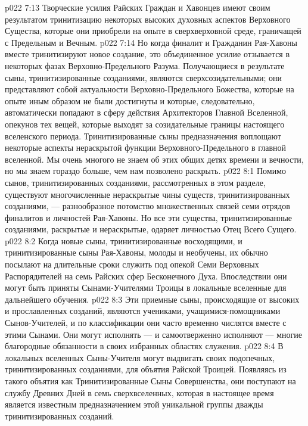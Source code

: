 \vs p022 7:13 \bibnobreakspace {} Творческие усилия Райских Граждан и Хавонцев имеют своим результатом тринитизацию некоторых высоких духовных аспектов Верховного Существа, которые они приобрели на опыте в сверхверховной среде, граничащей с Предельным и Вечным.
\vs p022 7:14 \bibnobreakspace {} Но когда финалит и Гражданин Рая\hyp{}Хавоны вместе тринитизируют новое создание, это объединенное усилие отзывается в некоторых фазах Верховно\hyp{}Предельного Разума. Получающиеся в результате сыны, тринитизированные созданиями, являются сверхсозидательными; они представляют собой актуальности Верховно\hyp{}Предельного Божества, которые на опыте иным образом не были достигнуты и которые, следовательно, автоматически попадают в сферу действия Архитекторов Главной Вселенной, опекунов тех вещей, которые выходят за созидательные границы настоящего вселенского периода. Тринитизированные сыны предназначения воплощают некоторые аспекты нераскрытой функции Верховного\hyp{}Предельного в главной вселенной. Мы очень многого не знаем об этих общих детях времени и вечности, но мы знаем гораздо больше, чем нам позволено раскрыть.
\vs p022 8:1 Помимо сынов, тринитизированных созданиями, рассмотренных в этом разделе, существуют многочисленные нераскрытые чины существ, тринитизированных созданиями, --- разнообразное потомство множественных связей семи отрядов финалитов и личностей Рая\hyp{}Хавоны. Но все эти существа, тринитизированные созданиями, раскрытые и нераскрытые, одаряет личностью Отец Всего Сущего.
\vs p022 8:2 \pc Когда новые сыны, тринитизированные восходящими, и тринитизированные сыны Рая\hyp{}Хавоны, молоды и необучены, их обычно посылают на длительные сроки служить под опекой Семи Верховных Распорядителей на семь Райских сфер Бесконечного Духа. Впоследствии они могут быть приняты Сынами\hyp{}Учителями Троицы в локальные вселенные для дальнейшего обучения.
\vs p022 8:3 Эти приемные сыны, происходящие от высоких и прославленных созданий, являются учениками, учащимися\hyp{}помощниками Сынов\hyp{}Учителей, и по классификации они часто временно числятся вместе с этими Сынами. Они могут исполнять --- и самоотверженно исполняют --- многие благородные обязанности в своих избранных областях служения.
\vs p022 8:4 В локальных вселенных Сыны\hyp{}Учителя могут выдвигать своих подопечных, тринитизированных созданиями, для объятия Райской Троицей. Появляясь из такого объятия как Тринитизированные Сыны Совершенства, они поступают на службу Древних Дней в семь сверхвселенных, которая в настоящее время является известным предназначением этой уникальной группы дважды тринитизированных созданий.
